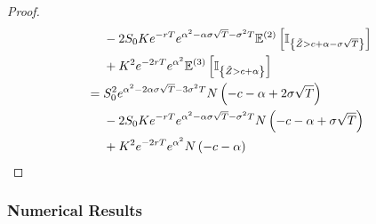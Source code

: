 \documentclass[12pt]{article}  %
\numberwithin{equation}{subsection}
\theoremstyle{plain}
\begin{document}
\begin{proof}
\begin{align}
&-2S_0Ke^{-rT}e^{\alpha^2-\alpha\sigma\sqrt{T}-\sigma^2 T}\mathbb{E}^{(2)}\left[ \mathbb{I}_{\left\lbrace \tilde{Z}>c+\alpha-\sigma\sqrt{T}\right\rbrace }\right] \notag\\
&+K^2e^{-2rT}e^{\alpha^2}\mathbb{E}^{(3)}\left[ \mathbb{I}_{\left\lbrace \tilde{Z}>c+\alpha\right\rbrace }\right] \notag\\
={}&S_0^2e^{\alpha^2-2\alpha\sigma\sqrt{T}-3\sigma^2 T}N\left( -c-\alpha+2\sigma\sqrt{T}\right) \notag\\
&-2S_0Ke^{-rT}e^{\alpha^2-\alpha\sigma\sqrt{T}-\sigma^2 T}N\left( -c-\alpha+\sigma\sqrt{T}\right) \notag\\
&+K^2e^{-2rT}e^{\alpha^2}N\left( -c-\alpha\right) \label{op0}
\end{align}
\end{proof}

\subsubsection{Numerical Results}
\end{document}
